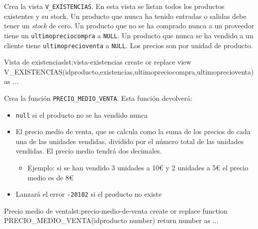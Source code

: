 \begin{homeworkProblem}

  Crea la vista \texttt{V\_EXISTENCIAS}. En esta vista se listan todos los productos existentes y su stock. Un producto que nunca ha tenido entradas o salidas debe tener un \textit{stock} de cero. Un producto que no se ha comprado nunca a un proveedor tiene un \texttt{ultimopreciocompra} a \texttt{NULL}. Un producto que nunca se ha vendido a un cliente tiene \texttt{ultimoprecioventa} a \texttt{NULL}. Los precios son por unidad de producto.

  \begin{listadosql}{Vista de existencias}{lst:vista-existencias}
create or replace view V_EXISTENCIAS(idproducto,existencias,ultimopreciocompra,ultimoprecioventa) as
...
  \end{listadosql}  
  
\end{homeworkProblem}


\begin{homeworkProblem}

  Crea la función \texttt{PRECIO\_MEDIO\_VENTA}. Esta función devolverá:
  \begin{itemize}
  \item \texttt{null} si el producto no se ha vendido nunca
  \item El precio medio de venta, que se calcula como la suma de los precios de cada una de las unidades vendidas, dividido por el número total de las unidades vendidas. El precio medio tendrá dos decimales.
    \begin{itemize}
    \item Ejemplo: si se han vendido 3 unidades a 10{\euro} y 2 unidades a 5{\euro} el precio medio es de 8{\euro}
    \end{itemize}
  \item Lanzará el error \texttt{-20102} si el producto no existe
  \end{itemize}

  \begin{listadosql}{Precio medio de venta}{lst:precio-medio-de-venta}
create or replace function PRECIO_MEDIO_VENTA(idproducto number) return number
as
...
  \end{listadosql}  
  
\end{homeworkProblem}


